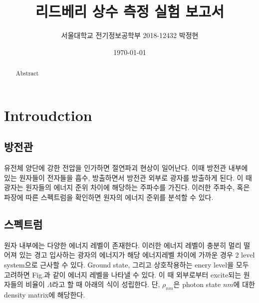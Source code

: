 \documentclass[%
 reprint,
 amsmath,amssymb,
 aps,
]{revtex4-2}
\begin{document}
\title{리드베리 상수 측정 실험 보고서}

\author{서울대학교 전기정보공학부 2018-12432 박정현}
\date{\today}%

\begin{abstract}
Abstract
\end{abstract}

\maketitle


\section{\label{sec:level1}Introudction}
\subsection{\label{sec:level2}방전관}
유전체 양단에 강한 전압을 인가하면 절연파괴 현상이 일어난다. 이때 방전관 내부에 있는 원자들이 전자들을 흡수, 방출하면서 방전관 외부로 광자를 방출하게 된다. 이 때 광자는 원자들의 에너지 준위 차이에 해당하는 주파수를 가진다. 이러한 주파수, 혹은 파장에 따른 스펙트럼을 확인하면 원자의 에너지 준위를 분석할 수 있다.

\subsection{\label{sec:level2}스펙트럼}
원자 내부에는 다양한 에너지 레벨이 존재한다. 이러한 에너지 레벨이 충분히 멀리 떨어져 있는 경고 입사하는 광자의 에너지가 해당 에너지레벨 차이에 가까운 경우 2 level system으로 근사할 수 있다. Ground state, 그리고 상호작용하는 enery level을 모두 고려하면 Fig.\label{fig:Level}과 같이 에너지 레벨을 나타낼 수 있다. 이 때 외부로부터 excite되는 원자들의 비율이 $\Lambda$라고 할 때 아래의 식이 성립한다. 단, $\rho_{nm}$은 photon state $nm$에 대한 density matrix에 해당한다.
\end{document}
